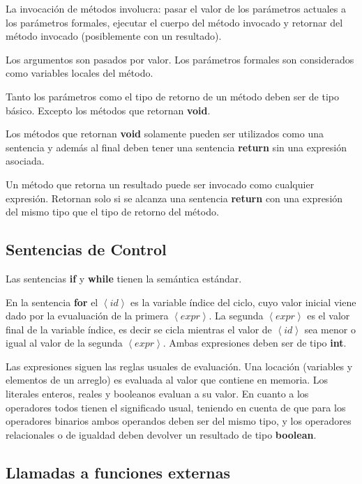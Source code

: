 \documentclass[11pt,a4paper]{article}
\begin{document}
La invocación de métodos involucra: pasar el valor de los parámetros actuales a los parámetros formales, ejecutar el cuerpo del método invocado y retornar del método invocado (posiblemente con un resultado).

Los argumentos son pasados por valor. Los parámetros formales son considerados como variables locales del método. 

Tanto los parámetros como el tipo de retorno de un método deben ser de tipo básico. Excepto los métodos que retornan \textbf{void}.

Los métodos que retornan \textbf{void} solamente pueden ser utilizados como una sentencia y además al final deben tener una sentencia \textbf{return} sin una expresión asociada. 

Un método que retorna un resultado puede ser invocado como cualquier expresión. Retornan solo si se alcanza una sentencia \textbf{return} con una expresión del mismo tipo que el tipo de retorno del método.

\subsection{Sentencias de Control}
\label{control}

Las sentencias \textbf{if} y \textbf{while} tienen la semántica estándar. 

En la sentencia \textbf{for} el $\left\langle id \right\rangle$  es la variable índice del ciclo, cuyo valor inicial viene dado por la evualuación de la primera $\left\langle expr \right\rangle$. La segunda $\left\langle expr \right\rangle$ es el valor final de la variable índice, es decir se cicla mientras el valor de $\left\langle id \right\rangle$ sea menor o igual al valor de la segunda $\left\langle expr \right\rangle$. Ambas expresiones deben ser de tipo \textbf{int}. 

Las expresiones siguen las reglas usuales de evaluación. Una locación (variables y elementos de un arreglo) es evaluada al valor que contiene en memoria. Los literales enteros, reales y booleanos evaluan a su valor. En cuanto a los operadores todos tienen el significado usual, teniendo en cuenta de que para los operadores binarios ambos operandos deben ser del mismo tipo, y los operadores relacionales o de igualdad deben devolver un resultado de tipo \textbf{boolean}.

\subsection{Llamadas a funciones externas}
\label{externas}
\end{document}

